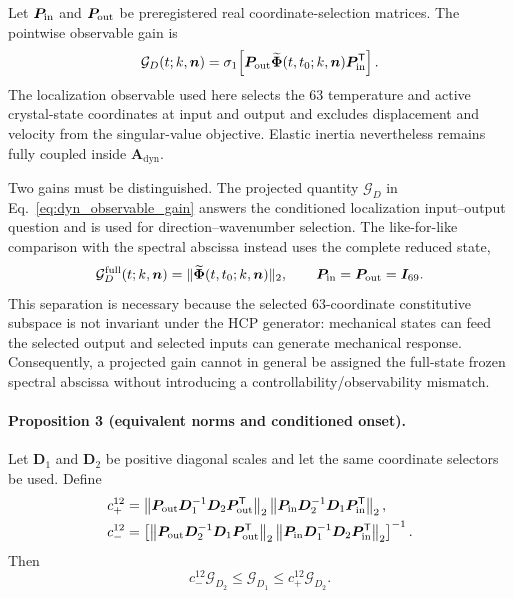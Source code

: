 Let $\boldsymbol P_{\rm in}$ and $\boldsymbol P_{\rm out}$ be preregistered
real coordinate-selection matrices.  The pointwise observable gain is
\begin{equation}
 \mathcal G_{D}(t;k,\boldsymbol n)
 =\sigma_1\!\left[
   \boldsymbol P_{\rm out}\widetilde{\boldsymbol\Phi}
   (t,t_0;k,\boldsymbol n)\boldsymbol P_{\rm in}^{\mathsf T}
  \right].
 \label{eq:dyn_observable_gain}
\end{equation}
The localization observable used here selects the 63 temperature and active
crystal-state coordinates at input and output and excludes displacement and
velocity from the singular-value objective.  Elastic inertia nevertheless
remains fully coupled inside $\boldsymbol A_{\mathrm{dyn}}$.

Two gains must be distinguished. The projected quantity
$\mathcal G_D$ in Eq.~\eqref{eq:dyn_observable_gain} answers the conditioned
localization input--output question and is used for direction--wavenumber
selection. The like-for-like comparison with the spectral abscissa instead
uses the complete reduced state,
\begin{equation}
 \mathcal G_D^{\rm full}(t;k,\boldsymbol n)
 =\|\widetilde{\boldsymbol\Phi}(t,t_0;k,\boldsymbol n)\|_2,
 \qquad
 \boldsymbol P_{\rm in}=\boldsymbol P_{\rm out}=\boldsymbol I_{69}.
 \label{eq:dyn_full_state_gain}
\end{equation}
This separation is necessary because the selected 63-coordinate constitutive
subspace is not invariant under the HCP generator: mechanical states can feed
the selected output and selected inputs can generate mechanical response.
Consequently, a projected gain cannot in general be assigned the full-state
frozen spectral abscissa without introducing a controllability/observability
mismatch.

\paragraph{Proposition 3 (equivalent norms and conditioned onset).}
Let $\boldsymbol D_1$ and $\boldsymbol D_2$ be positive diagonal scales and
let the same coordinate selectors be used.  Define
\begin{align}
 c_+^{12}
 &=\left\|\boldsymbol P_{\rm out}\boldsymbol D_1^{-1}
   \boldsymbol D_2\boldsymbol P_{\rm out}^{\mathsf T}\right\|_2
   \left\|\boldsymbol P_{\rm in}\boldsymbol D_2^{-1}
   \boldsymbol D_1\boldsymbol P_{\rm in}^{\mathsf T}\right\|_2,\\
 c_-^{12}
 &=\left[
   \left\|\boldsymbol P_{\rm out}\boldsymbol D_2^{-1}
   \boldsymbol D_1\boldsymbol P_{\rm out}^{\mathsf T}\right\|_2
   \left\|\boldsymbol P_{\rm in}\boldsymbol D_1^{-1}
   \boldsymbol D_2\boldsymbol P_{\rm in}^{\mathsf T}\right\|_2
   \right]^{-1}.
\end{align}
Then
\begin{equation}
 c_-^{12}\mathcal G_{D_2}
 \le \mathcal G_{D_1}
 \le c_+^{12}\mathcal G_{D_2}.
 \label{eq:dyn_norm_equivalence_bound}
\end{equation}

